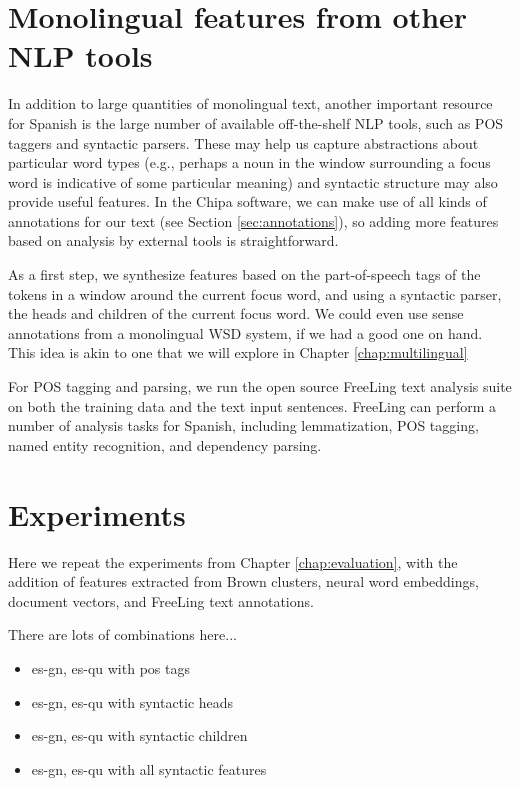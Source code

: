 \section{Monolingual features from other NLP tools}
In addition to large quantities of monolingual text, another important resource
for Spanish is the large number of available off-the-shelf NLP tools, such as
POS taggers and syntactic parsers. These may help us capture abstractions about
particular word types (e.g., perhaps a noun in the window surrounding a focus
word is indicative of some particular meaning) and syntactic structure may also
provide useful features.  In the Chipa software, we can make use of all kinds
of annotations for our text (see Section \ref{sec:annotations}), so adding more
features based on analysis by external tools is straightforward.

As a first step, we synthesize features based on the part-of-speech tags of the
tokens in a window around the current focus word, and using a syntactic parser,
the heads and children of the current focus word.  We could even use sense
annotations from a monolingual WSD system, if we had a good one on hand. This
idea is akin to one that we will explore in Chapter \ref{chap:multilingual}

For POS tagging and parsing, we run the open source FreeLing text analysis
suite \cite{padro12} on both the training data and the text input sentences.
FreeLing can perform a number of analysis tasks for Spanish, including
lemmatization, POS tagging, named entity recognition, and dependency parsing.

\section{Experiments}
Here we repeat the experiments from Chapter \ref{chap:evaluation}, with the
addition of features extracted from Brown clusters, neural word embeddings,
document vectors, and FreeLing text annotations.

There are lots of combinations here...

\begin{itemize}
  \item es-gn, es-qu with pos tags
  \item es-gn, es-qu with syntactic heads
  \item es-gn, es-qu with syntactic children
  \item es-gn, es-qu with all syntactic features
\end{itemize}

